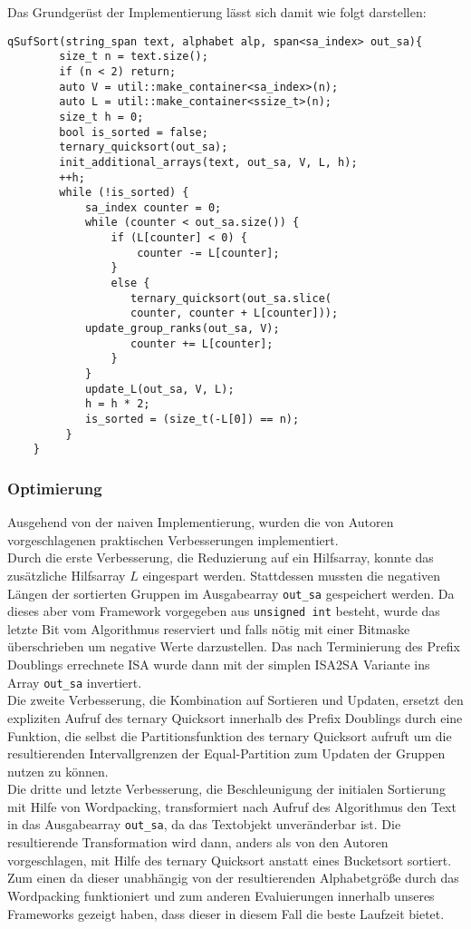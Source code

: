 Das Grundgerüst der Implementierung lässt sich damit wie folgt darstellen:\\
\newpage
\begin{samepage}
\begin{verbatim}
qSufSort(string_span text, alphabet alp, span<sa_index> out_sa){
        size_t n = text.size();
        if (n < 2) return;  
        auto V = util::make_container<sa_index>(n);
        auto L = util::make_container<ssize_t>(n);           
        size_t h = 0;
        bool is_sorted = false;
        ternary_quicksort(out_sa);
        init_additional_arrays(text, out_sa, V, L, h);
        ++h;
        while (!is_sorted) {
            sa_index counter = 0;
            while (counter < out_sa.size()) {
                if (L[counter] < 0) {
                    counter -= L[counter];
                }
                else {
                   ternary_quicksort(out_sa.slice(
                   counter, counter + L[counter]));
           	update_group_ranks(out_sa, V);
                   counter += L[counter];
                }
            }
            update_L(out_sa, V, L);
            h = h * 2;
            is_sorted = (size_t(-L[0]) == n);
         }
    }
\end{verbatim}
\end{samepage}
\subsubsection{Optimierung}
Ausgehend von der naiven Implementierung, wurden die von Autoren vorgeschlagenen praktischen Verbesserungen implementiert. \\
Durch die erste Verbesserung, die Reduzierung auf ein Hilfsarray, konnte das zusätzliche Hilfsarray $L$ eingespart werden. Stattdessen mussten die negativen Längen der sortierten Gruppen im Ausgabearray \texttt{out_sa} gespeichert werden. Da dieses aber vom Framework vorgegeben aus \texttt{unsigned int} besteht, wurde das letzte Bit vom Algorithmus reserviert und falls nötig mit einer Bitmaske überschrieben um \glqq negative\grqq{} Werte darzustellen. Das nach Terminierung des Prefix Doublings errechnete ISA wurde dann mit der simplen ISA2SA Variante ins Array \texttt{out_sa} invertiert. \\
Die zweite Verbesserung, die Kombination auf Sortieren und Updaten, ersetzt den expliziten Aufruf des ternary Quicksort innerhalb des Prefix Doublings durch eine Funktion, die selbst die Partitionsfunktion des ternary Quicksort aufruft um die resultierenden Intervallgrenzen der Equal-Partition zum Updaten der Gruppen nutzen zu können.\\
Die dritte und letzte Verbesserung, die Beschleunigung der initialen Sortierung mit Hilfe von Wordpacking, transformiert nach Aufruf des Algorithmus den Text in das Ausgabearray \texttt{out_sa}, da das Textobjekt unveränderbar ist. Die resultierende Transformation wird dann, anders als von den Autoren vorgeschlagen, mit Hilfe des ternary Quicksort anstatt eines Bucketsort sortiert. Zum einen da dieser unabhängig von der resultierenden Alphabetgröße durch das Wordpacking funktioniert und zum anderen Evaluierungen innerhalb unseres Frameworks gezeigt haben, dass dieser in diesem Fall die beste Laufzeit bietet.
